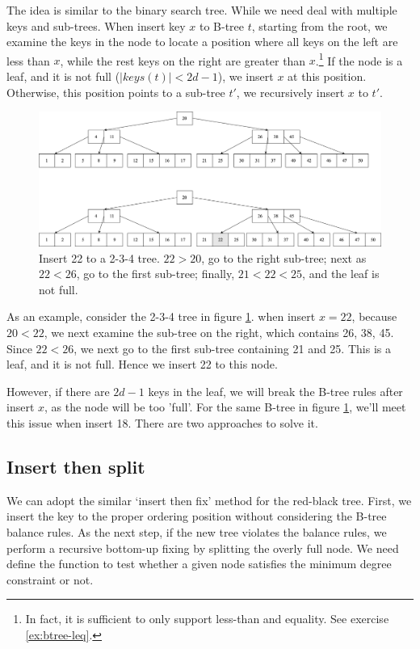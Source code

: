 \documentclass[b5paper]{article}
\begin{document}
The idea is similar to the binary search tree. While we need deal with multiple keys and sub-trees. When insert key $x$ to B-tree $t$, starting from the root, we examine the keys in the node to locate a position where all keys on the left are less than $x$, while the rest keys on the right are greater than $x$.\footnote{In fact, it is sufficient to only support less-than and equality. See exercise \ref{ex:btree-leq}.} If the node is a leaf, and it is not full ($|keys(t)| < 2d - 1$), we insert $x$ at this position. Otherwise, this position points to a sub-tree $t'$, we recursively insert $x$ to $t'$.

\begin{figure}[htbp]
  \centering
  \includegraphics[scale=0.4]{img/btree-insert-example.png}
  \caption{Insert 22 to a 2-3-4 tree. $22 > 20$, go to the right sub-tree; next as $22 < 26$, go to the first sub-tree; finally, $21 < 22 < 25$, and the leaf is not full.}
  \label{fig:btree-insert-simple}
\end{figure}

As an example, consider the 2-3-4 tree in figure \ref{fig:btree-insert-simple}. when insert $x = 22$, because $20 < 22$, we next examine the sub-tree on the right, which contains 26, 38, 45. Since $22 < 26$, we next go to the first sub-tree containing 21 and 25. This is a leaf, and it is not full. Hence we insert 22 to this node.

However, if there are $2d - 1$ keys in the leaf, we will break the B-tree rules after insert $x$, as the node will be too 'full'. For the same B-tree in figure \ref{fig:btree-insert-simple}, we'll meet this issue when insert 18. There are two approaches to solve it.

\subsection{Insert then split}

We can adopt the similar `insert then fix' method for the red-black tree. First, we insert the key to the proper ordering position without considering the B-tree balance rules. As the next step, if the new tree violates the balance rules, we perform a recursive bottom-up fixing by splitting the overly full node. We need define the function to test whether a given node satisfies the minimum degree constraint or not.
\end{document}
